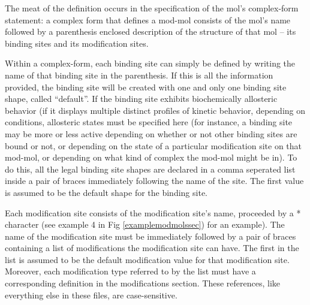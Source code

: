 The meat of the definition occurs in the specification of the mol's
complex-form statement: a complex form that defines a mod-mol consists
of the mol's name followed by a parenthesis enclosed description of the
structure of that mol -- its binding sites and its modification sites.

Within a complex-form, each binding site can simply be defined by
writing the name of that binding site in the parenthesis.  If this is
all the information provided, the binding site will be created with
one and only one binding site shape, called ``default''.  If the
binding site exhibits biochemically allosteric behavior (if it
displays multiple distinct profiles of kinetic behavior, depending on
conditions, allosteric states must be specified here (for instance, a
binding site may be more or less active depending on whether or not
other binding sites are bound or not, or depending on the state of a
particular modification site on that mod-mol, or depending on what
kind of complex the mod-mol might be in).  To do this, all the legal
binding site shapes are declared in a comma seperated list inside a
pair of braces immediately following the name of the site.  The first
value is assumed to be the default shape for the binding site.

Each modification site consists of the modification site's name,
proceeded by a * character (see example 4 in Fig
\ref{examplemodmolssec}) for an example).  The name of the
modification site must be immediately followed by a pair of braces
containing a list of modifications the modification site can have.
The first in the list is assumed to be the default modification value
for that modification site.  Moreover, each modification type referred
to by the list must have a corresponding definition in the
modifications section.  These references, like everything else in
these files, are case-sensitive.

